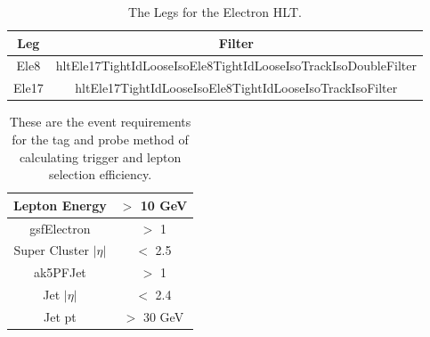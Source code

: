 \begin{table}[htb]
\caption{%
The Legs for the Electron HLT.
}
\begin{center}
  \begin{tabular}{ | c | c |} \hline
    Leg & Filter \\ \hline \hline
    Ele8 & hltEle17TightIdLooseIsoEle8TightIdLooseIsoTrackIsoDoubleFilter \\ \hline
    Ele17 & hltEle17TightIdLooseIsoEle8TightIdLooseIsoTrackIsoFilter \\ \hline
  \end{tabular}
\end{center}
\label{tab:trigger_stuff}
\end{table}



\begin{table}[htb]
\caption{%
  These are the event requirements for the tag and probe method of calculating trigger and lepton selection efficiency.
}
\begin{center}
  \begin{tabular}{ | c | c |} \hline
    Lepton Energy & $>$ 10 GeV \\ \hline
    gsfElectron & $>$ 1 \\ \hline
    Super Cluster $|\eta|$ &  $<$ 2.5 \\ \hline
    ak5PFJet  & $>$ 1 \\ \hline
    Jet $|\eta|$ & $<$ 2.4 \\ \hline
    Jet pt & $>$ 30 GeV \\ \hline
  \end{tabular}
\end{center}
\label{tab:tagandprobe_requirements}
\end{table}


